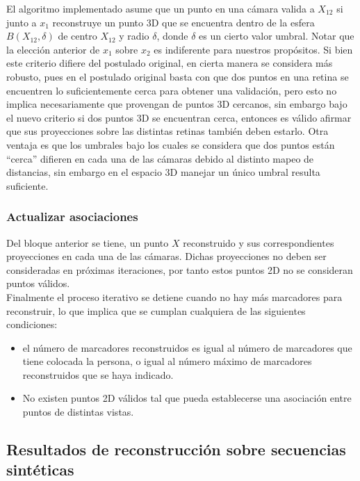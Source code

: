 El algoritmo implementado asume que un punto en una cámara valida a $X_{12}$ si junto a $x_1$ reconstruye un punto 3D que se encuentra dentro de la esfera $B(X_{12}, \delta)$ de centro $X_{12}$ y radio $\delta$, donde $\delta$ es un cierto valor umbral. Notar que la elección anterior de $x_1$ sobre $x_2$ es indiferente para nuestros propósitos. Si bien este criterio difiere del postulado original, en cierta manera se considera más robusto, pues en el postulado original basta con que dos puntos en una retina se encuentren lo suficientemente cerca para obtener una validación, pero esto no implica necesariamente que provengan de puntos 3D cercanos, sin embargo bajo el nuevo criterio si dos puntos 3D se encuentran cerca, entonces es válido afirmar que sus proyecciones sobre las distintas retinas también deben estarlo. Otra ventaja es que los umbrales bajo los cuales se considera que dos puntos están ``cerca'' difieren en cada una de las cámaras debido al distinto mapeo de distancias, sin embargo en el espacio 3D manejar un único umbral resulta suficiente.       

\subsubsection{Actualizar asociaciones}\label{actualizar_asociaciones}

Del bloque anterior se tiene, un punto $X$ reconstruido y sus correspondientes proyecciones en cada una de las cámaras. Dichas proyecciones no deben ser consideradas en próximas iteraciones, por tanto estos puntos 2D no se consideran puntos válidos.\\



Finalmente el proceso iterativo se detiene cuando no hay más marcadores para reconstruir, lo que implica que se cumplan cualquiera de las siguientes condiciones:\\
\begin{itemize}
\item el número de marcadores reconstruidos es igual al número de marcadores que tiene colocada la persona, o igual al número máximo de marcadores  reconstruidos que se haya indicado.

\item No existen puntos 2D válidos tal que pueda establecerse una asociación entre puntos de distintas vistas.
\end{itemize}




\subsection{Resultados de reconstrucción sobre secuencias sintéticas}

